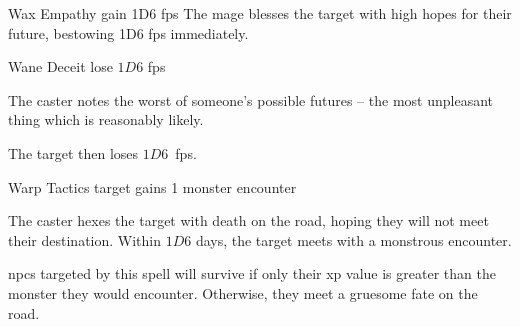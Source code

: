   {\mFate}%
  {Wax}%
  {}%
  {Empathy}%
  {gain 1D6 \glspl{fp}}%
  {
    The mage blesses the target with high hopes for their future, bestowing 1D6 \glspl{fp} immediately.
  }


  {\mFate}%
  {Wane}%
  {}%
  {Deceit}%
  {lose $1D6$ \glspl{fp}}%
  {

The caster notes the worst of someone's possible futures -- the most unpleasant thing which is reasonably likely.
  }


The target then loses $1D6$~\glspl{fp}.

  {\mFate}%
  {Warp}%
  {}%
  {Tactics}%
  {target gains 1 monster encounter}%

The caster hexes the target with death on the road, hoping they will not meet their destination.
Within $1D6$ days, the target meets with a monstrous encounter.%

\Glspl{npc} targeted by this spell will survive if only their \gls{xp} value is greater than the monster they would encounter.
Otherwise, they meet a gruesome fate on the road.

